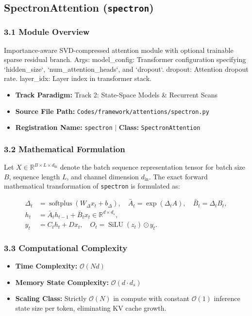 \subsection{SpectronAttention (\texttt{spectron})}
\label{sec:app_module_spectron}

\subsubsection*{3.1 Module Overview}
Importance-aware SVD-compressed attention module with optional trainable sparse residual branch.  Args:     model\_config: Transformer configuration specifying `hidden\_size`, `num\_attention\_heads`, and `dropout`.     dropout: Attention dropout rate.     layer\_idx: Layer index in transformer stack.
\begin{itemize}
    \item \textbf{Track Paradigm:} Track 2: State-Space Models & Recurrent Scans
    \item \textbf{Source File Path:} \texttt{Codes/framework/attentions/spectron.py}
    \item \textbf{Registration Name:} \texttt{spectron} $\mid$ \textbf{Class:} \texttt{SpectronAttention}
\end{itemize}

\subsubsection*{3.2 Mathematical Formulation}
Let $X \in \mathbb{R}^{B \times L \times d_{\text{in}}}$ denote the batch sequence representation tensor for batch size $B$, sequence length $L$, and channel dimension $d_{\text{in}}$. The exact forward mathematical transformation of \texttt{spectron} is formulated as:

\begin{align}
\Delta_t &= \operatorname{softplus}(W_\Delta x_t + b_\Delta), \quad \bar{A}_t = \exp(\Delta_t A), \quad \bar{B}_t = \Delta_t B_t, \\
h_t &= \bar{A}_t h_{t-1} + \bar{B}_t x_t \in \mathbb{R}^{d \times d_s}, \\
y_t &= C_t h_t + D x_t, \quad O_t = \operatorname{SiLU}(z_t) \odot y_t.
\end{align}


\subsubsection*{3.3 Computational Complexity}
\begin{itemize}
    \item \textbf{Time Complexity:} $\mathcal{O}(N d)$
    \item \textbf{Memory State Complexity:} $\mathcal{O}(d \cdot d_s)$
    \item \textbf{Scaling Class:} Strictly $\mathcal{O}(N)$ in compute with constant $\mathcal{O}(1)$ inference state size per token, eliminating KV cache growth.
\end{itemize}


